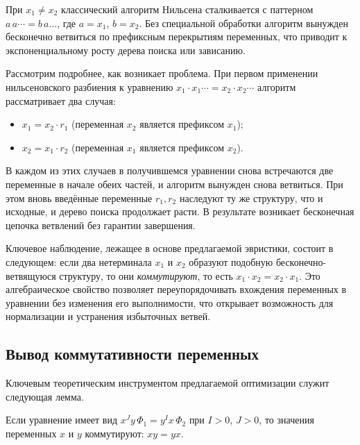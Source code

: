 \documentclass[14pt, russian]{scrartcl}
\begin{document}
При $x_1 \neq x_2$ классический алгоритм Нильсена сталкивается с паттерном
$a\,a\cdots = b\,a\ldots$, где $a = x_1$, $b = x_2$. Без специальной обработки
алгоритм вынужден бесконечно ветвиться по префиксным перекрытиям переменных,
что приводит к экспоненциальному росту дерева поиска или зависанию.

Рассмотрим подробнее, как возникает проблема. При первом применении
нильсеновского разбиения к уравнению $x_1 \cdot x_1 \cdots = x_2 \cdot x_2 \cdots$
алгоритм рассматривает два случая:
\begin{itemize}
\item $x_1 = x_2 \cdot r_1$ (переменная $x_2$ является префиксом $x_1$);
\item $x_2 = x_1 \cdot r_2$ (переменная $x_1$ является префиксом $x_2$).
\end{itemize}

В каждом из этих случаев в получившемся уравнении снова встречаются две переменные
в начале обеих частей, и алгоритм вынужден снова ветвиться. При этом вновь введённые
переменные $r_1, r_2$ наследуют ту же структуру, что и исходные, и дерево поиска
продолжает расти. В результате возникает бесконечная цепочка ветвлений без
гарантии завершения.

Ключевое наблюдение, лежащее в основе предлагаемой эвристики, состоит в следующем:
если два нетерминала $x_1$ и $x_2$ образуют подобную бесконечно-ветвящуюся
структуру, то они \emph{коммутируют}, то есть $x_1 \cdot x_2 = x_2 \cdot x_1$.
Это алгебраическое свойство позволяет переупорядочивать вхождения переменных
в уравнении без изменения его выполнимости, что открывает возможность для
нормализации и устранения избыточных ветвей.

\subsection{Вывод коммутативности переменных}

Ключевым теоретическим инструментом предлагаемой оптимизации служит следующая лемма.

\begin{Lemma}\label{lem:comm}
Если уравнение имеет вид $x^J y\, \Phi_1 = y^I x\, \Phi_2$ при $I > 0$, $J > 0$,
то значения переменных $x$ и $y$ коммутируют: $xy = yx$.
\end{Lemma}
\end{document}
